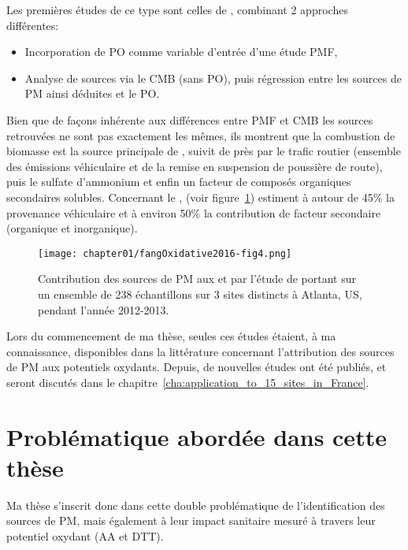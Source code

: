 Les premières études de ce type sont celles de
\textcite{vermaReactive2014,batesReactive2015,fangOxidative2016}, combinant 2 approches
différentes:
\begin{itemize}
    \item Incorporation de PO comme variable d'entrée d'une étude PMF,
    \item Analyse de sources via le CMB (sans PO), puis régression entre les sources de PM
        ainsi déduites et le PO.
\end{itemize}
Bien que de façons inhérente aux différences entre PMF et CMB les sources retrouvées ne
sont pas exactement les mêmes, ils montrent que la combustion de biomasse est la source
principale de \PODTTv, suivit de près par le trafic routier (ensemble des émissions
véhiculaire et de la remise en suspension de poussière de route), puis le sulfate
d'ammonium et enfin un facteur de composés organiques secondaires solubles.
Concernant le \POAAv, \textcite{fangOxidative2016} (voir
figure~\ref{fig:chapter01/fangOxidative2016-fig4}) estiment à autour de 45\% la
provenance véhiculaire et à environ 50\% la contribution de facteur secondaire (organique
et inorganique).

\begin{figure}[ht]
    \centering
    \texttt{[image: chapter01/fangOxidative2016-fig4.png]}
    \caption{Contribution des sources de PM aux \POAAv{} et \PODTTv{} par l'étude de
    \textcite{fangOxidative2016} portant sur un ensemble de 238 échantillons sur 3 sites
        distincts à Atlanta, US, pendant l'année 2012-2013.}%
    \label{fig:chapter01/fangOxidative2016-fig4}
\end{figure}

Lors du commencement de ma thèse, seules ces études étaient, à ma connaissance,
disponibles dans la littérature concernant l'attribution des sources de PM aux potentiels
oxydants.  Depuis, de nouvelles études ont été publiés, et seront discutés dans le
chapitre~\ref{cha:application_to_15_sites_in_France}.


\section{Problématique abordée dans cette thèse}%
\label{sec:positionnement_de_cette_thèse}

Ma thèse s'inscrit donc dans cette double problématique de l'identification des sources de
PM, mais également à leur impact sanitaire mesuré à travers leur potentiel oxydant (AA et
DTT).

